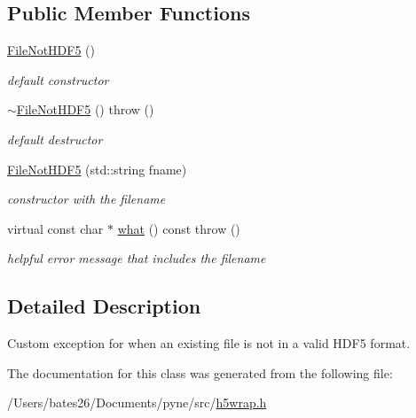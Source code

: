 \subsection*{Public Member Functions}
\begin{DoxyCompactItemize}
\item 
\hypertarget{classh5wrap_1_1_file_not_h_d_f5_a3fa40cb39abaa241e80ee97a13e69815}{\hyperlink{classh5wrap_1_1_file_not_h_d_f5_a3fa40cb39abaa241e80ee97a13e69815}{File\+Not\+H\+D\+F5} ()}\label{classh5wrap_1_1_file_not_h_d_f5_a3fa40cb39abaa241e80ee97a13e69815}

\begin{DoxyCompactList}\small\item\em default constructor \end{DoxyCompactList}\item 
\hypertarget{classh5wrap_1_1_file_not_h_d_f5_a55276b2bc97da82f25a0718327b00742}{\hyperlink{classh5wrap_1_1_file_not_h_d_f5_a55276b2bc97da82f25a0718327b00742}{$\sim$\+File\+Not\+H\+D\+F5} ()  throw ()}\label{classh5wrap_1_1_file_not_h_d_f5_a55276b2bc97da82f25a0718327b00742}

\begin{DoxyCompactList}\small\item\em default destructor \end{DoxyCompactList}\item 
\hypertarget{classh5wrap_1_1_file_not_h_d_f5_ac6f9e6588f3a55f26fe6cd13ab75425b}{\hyperlink{classh5wrap_1_1_file_not_h_d_f5_ac6f9e6588f3a55f26fe6cd13ab75425b}{File\+Not\+H\+D\+F5} (std\+::string fname)}\label{classh5wrap_1_1_file_not_h_d_f5_ac6f9e6588f3a55f26fe6cd13ab75425b}

\begin{DoxyCompactList}\small\item\em constructor with the filename \end{DoxyCompactList}\item 
\hypertarget{classh5wrap_1_1_file_not_h_d_f5_afce2273e3c8d54802598bdc30cdedec2}{virtual const char $\ast$ \hyperlink{classh5wrap_1_1_file_not_h_d_f5_afce2273e3c8d54802598bdc30cdedec2}{what} () const   throw ()}\label{classh5wrap_1_1_file_not_h_d_f5_afce2273e3c8d54802598bdc30cdedec2}

\begin{DoxyCompactList}\small\item\em helpful error message that includes the filename \end{DoxyCompactList}\end{DoxyCompactItemize}


\subsection{Detailed Description}
Custom exception for when an existing file is not in a valid H\+D\+F5 format. 

The documentation for this class was generated from the following file\+:\begin{DoxyCompactItemize}
\item 
/\+Users/bates26/\+Documents/pyne/src/\hyperlink{h5wrap_8h}{h5wrap.\+h}\end{DoxyCompactItemize}
